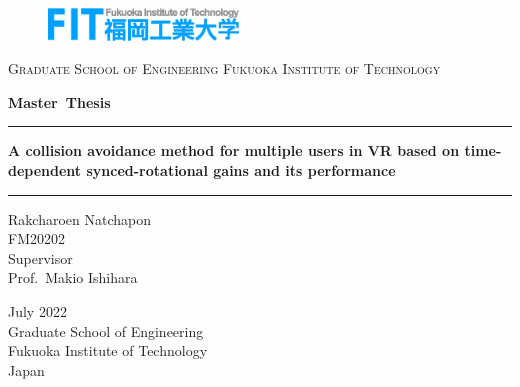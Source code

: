 \documentclass[uplatex,
12pt, %
a4paper,
english, %
oneside,
titlepage,
singlespacing, %
liststotoc, %
headsepline,
]{MastersDoctoralThesis} %
\author{Rakcharoen Natchapon} %
\begin{document}
\frontmatter %

\pagestyle{plain} %

\begin{titlepage}
\begin{center}

\begin{figure}[!t]
	\centering
	\includegraphics[width=0.45\textwidth]{Pictures/fit.eps}
	\label{fig:logo}
	\vspace{-0.8cm}
\end{figure}

\textsc{Graduate School of Engineering Fukuoka Institute of Technology} \\


\vspace{1.0cm}
\begin{LARGE}
	
	\textbf{Master~Thesis}
	
	\vspace{+2.cm}
	
	
	\hrule height 2pt
	
	\vspace{+0.5cm}
		\textbf{A collision avoidance method for multiple users in VR based on time-dependent synced-rotational gains and its performance}

	
	\vspace{+0.5cm}
	
	\hrule height 2pt
	
	\vspace{+3.0cm}
	
	
	
	Rakcharoen Natchapon\\
	FM20202\\
	\vspace{+3.0cm}
	{\Large{
			Supervisor\\
			Prof.~Makio Ishihara \\
		}
	}
	
	\vspace{+1.5cm}
	

	
	{\Large July 2022  \\\vspace{+1cm}\Large Graduate School of Engineering \\Fukuoka Institute of Technology\\ Japan}
	
\end{LARGE}
\end{center}
\end{titlepage}
\end{document}
